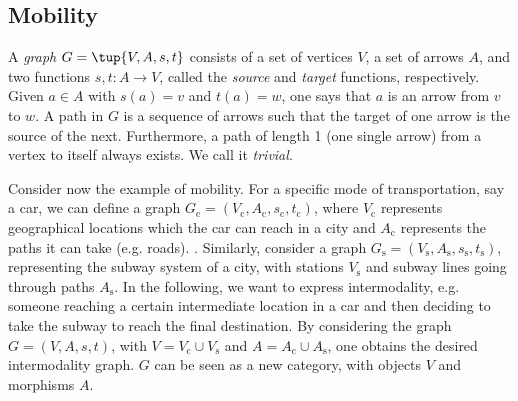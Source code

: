 \subsection{Mobility}
\begin{definition}[Graph]
A \emph{graph} $G=\tup{V,A,s,t}$ consists of a set of vertices $V$, a set of arrows $A$, and two functions $s,t\colon A\to V$, called the \emph{source} and \emph{target} functions, respectively. Given $a\in A$ with $s(a)=v$ and $t(a)=w$, one says that $a$ is an arrow from $v$ to $w$. A path in $G$ is a sequence of arrows such that the target of one arrow is the source of the next. Furthermore, a path of length 1 (one single arrow) from a vertex to itself always exists. We call it \emph{trivial}.
\end{definition}
Consider now the example of mobility. For a specific mode of transportation, say a car, we can define a graph $G_\mathrm{c}=(V_\mathrm{c},A_\mathrm{c},s_\mathrm{c},t_\mathrm{c})$, where $V_\mathrm{c}$ represents geographical locations which the car can reach in a city and $A_\mathrm{c}$ represents the paths it can take (e.g. roads). . Similarly, consider a graph $G_\mathrm{s}=(V_\mathrm{s},A_\mathrm{s},s_\mathrm{s},t_\mathrm{s})$, representing the subway system of a city, with stations $V_\mathrm{s}$ and subway lines going through paths $A_\mathrm{s}$. In the following, we want to express intermodality, e.g. someone reaching a certain intermediate location in a car and then deciding to take the subway to reach the final destination. By considering the graph $G=(V,A,s,t)$, with $V=V_\mathrm{c}\cup V_\mathrm{s}$ and $A=A_\mathrm{c}\cup A_\mathrm{s}$, one obtains the desired intermodality graph. $G$ can be seen as a new category, with objects $V$ and morphisms $A$.
